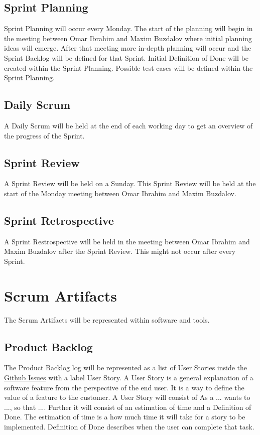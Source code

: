 \subsection{Sprint Planning}
Sprint Planning will occur every Monday. The start of the planning will begin in the meeting between Omar Ibrahim and 
Maxim Buzdalov where initial planning ideas will emerge. After that meeting more in-depth planning will occur and the 
Sprint Backlog will be defined for that Sprint. Initial Definition of Done will be created within the Sprint Planning.
Possible test cases will be defined within the Sprint Planning.

\subsection{Daily Scrum}
A Daily Scrum will be held at the end of each working day to get an overview of the progress of the Sprint.

\subsection{Sprint Review}
A Sprint Review will be held on a Sunday. This Sprint Review will be held at the start of the Monday meeting between 
Omar Ibrahim and Maxim Buzdalov.

\subsection{Sprint Retrospective}
A Sprint Restrospective will be held in the meeting between Omar Ibrahim and Maxim Buzdalov after the Sprint Review. 
This might not occur after every Sprint.

\section{Scrum Artifacts}
The Scrum Artifacts will be represented within software and tools.\newline

\subsection{Product Backlog}
The Product Backlog log will be represented as a list of User Stories inside the 
\href{https://github.com/TheRealShoxie/Interactive-Robot-Chess/issues}{\color{blue}Github Issues} with a label User Story.
A User Story\cite{user_story} is a general explanation of a software feature from the perspective of 
the end user. It is a way to define the value of a feature to the customer. A User Story will consist of 
As a ... wants to ..., so that .... Further it will consist of an estimation of time and a Definition of Done. 
The estimation of time is a how much time it will take for a story to be implemented. Definition of Done describes when 
the user can complete that task.


